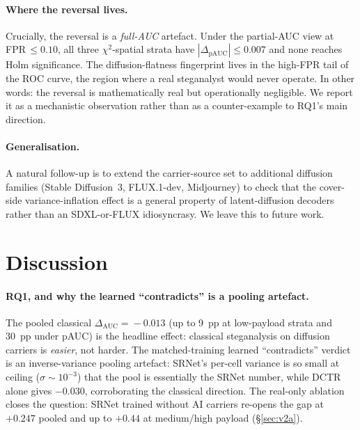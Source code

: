\documentclass[10pt,twocolumn,a4paper]{article}
\begin{document}
\paragraph{Where the reversal lives.} Crucially, the reversal is a \emph{full-AUC} artefact. Under the partial-AUC view at FPR\,$\leq\!0.10$, all three $\chi^2$-spatial strata have $|\Delta_\text{pAUC}|\!\leq\!0.007$ and none reaches Holm significance. The diffusion-flatness fingerprint lives in the high-FPR tail of the ROC curve, the region where a real steganalyst would never operate. In other words: the reversal is mathematically real but operationally negligible. We report it as a mechanistic observation rather than as a counter-example to RQ1's main direction.

\paragraph{Generalisation.} A natural follow-up is to extend the carrier-source set to additional diffusion families (Stable Diffusion~3, FLUX.1-dev, Midjourney) to check that the cover-side variance-inflation effect is a general property of latent-diffusion decoders rather than an SDXL-or-FLUX idiosyncrasy. We leave this to future work.

\section{Discussion}
\label{sec:discussion}

\paragraph{RQ1, and why the learned ``contradicts'' is a pooling artefact.} The pooled classical $\Delta_\text{AUC}\!=\!-0.013$ (up to 9~pp at low-payload strata and 30~pp under pAUC) is the headline effect: classical steganalysis on diffusion carriers is \emph{easier}, not harder. The matched-training learned ``contradicts'' verdict is an inverse-variance pooling artefact: SRNet's per-cell variance is so small at ceiling ($\sigma\!\sim\!10^{-3}$) that the pool is essentially the SRNet number, while DCTR alone gives $-0.030$, corroborating the classical direction. The real-only ablation closes the question: SRNet trained without AI carriers re-opens the gap at $+0.247$ pooled and up to $+0.44$ at medium/high payload (\S\ref{sec:v2a}).
\end{document}
